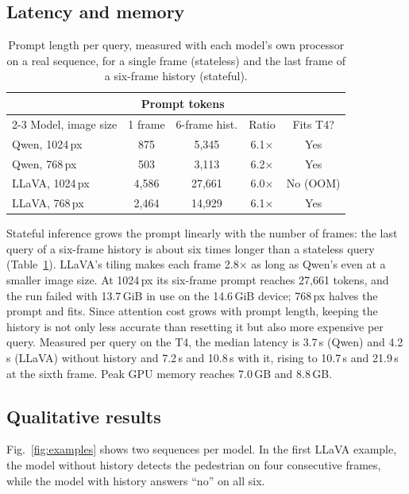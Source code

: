 \documentclass[conference]{IEEEtran}
\begin{document}
\subsection{Latency and memory}

\begin{table}[t]
\centering
\caption{Prompt length per query, measured with each model's own processor on a real sequence, for a single frame (stateless) and the last frame of a six-frame history (stateful).}
\label{tab:profile}
\setlength{\tabcolsep}{4pt}
\begin{tabular}{@{}lcccc@{}}
\toprule
& \multicolumn{2}{c}{Prompt tokens} & & \\
\cmidrule(lr){2-3}
Model, image size & 1 frame & 6-frame hist. & Ratio & Fits T4?\\
\midrule
Qwen, 1024\,px  & 875     & 5{,}345  & 6.1$\times$ & Yes\\
Qwen, 768\,px   & 503     & 3{,}113  & 6.2$\times$ & Yes\\
LLaVA, 1024\,px & 4{,}586 & 27{,}661 & 6.0$\times$ & No (OOM)\\
LLaVA, 768\,px  & 2{,}464 & 14{,}929 & 6.1$\times$ & Yes\\
\bottomrule
\end{tabular}
\end{table}

Stateful inference grows the prompt linearly with the number of frames: the last query of a six-frame history is about six times longer than a stateless query (Table~\ref{tab:profile}). LLaVA's tiling makes each frame 2.8$\times$ as long as Qwen's even at a smaller image size. At 1024\,px its six-frame prompt reaches 27{,}661 tokens, and the run failed with 13.7\,GiB in use on the 14.6\,GiB device; 768\,px halves the prompt and fits. Since attention cost grows with prompt length, keeping the history is not only less accurate than resetting it but also more expensive per query. Measured per query on the T4, the median latency is 3.7\,s (Qwen) and 4.2\,s (LLaVA) without history and 7.2\,s and 10.8\,s with it, rising to 10.7\,s and 21.9\,s at the sixth frame. Peak GPU memory reaches 7.0\,GB and 8.8\,GB.

\subsection{Qualitative results}

Fig.~\ref{fig:examples} shows two sequences per model. In the first LLaVA example, the model without history detects the pedestrian on four consecutive frames, while the model with history answers ``no'' on all six.
\end{document}
